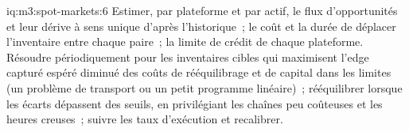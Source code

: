 \begin{solution}{iq:m3:spot-markets:6}
Estimer, par plateforme et par actif, le flux d'opportunités et leur dérive à sens unique d'après l'historique~; le coût et la durée de
déplacer l'inventaire entre chaque paire~; la limite de crédit de chaque plateforme. Résoudre périodiquement pour les inventaires cibles qui
maximisent l'edge capturé espéré diminué des coûts de rééquilibrage et de capital dans les limites (un problème de transport ou un petit
programme linéaire)~; rééquilibrer lorsque les écarts dépassent des seuils, en privilégiant les chaînes peu coûteuses et les heures creuses~; suivre les taux d'exécution et
recalibrer.
\end{solution}
